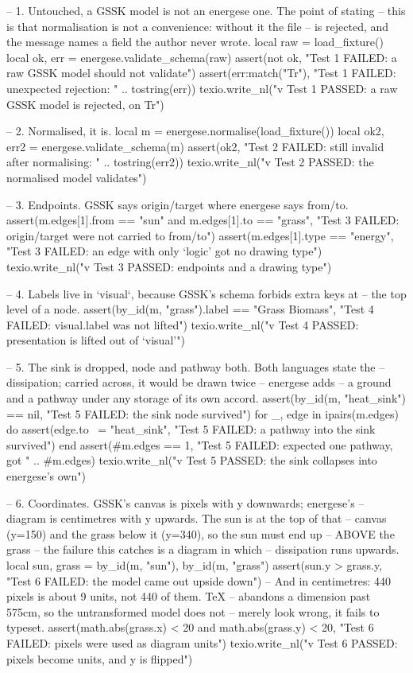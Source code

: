 \documentclass{article}
\begin{document}
\begin{luacode*}
    -- 1. Untouched, a GSSK model is not an energese one. The point of stating
    --    this is that normalisation is not a convenience: without it the file
    --    is rejected, and the message names a field the author never wrote.
    local raw = load_fixture()
    local ok, err = energese.validate_schema(raw)
    assert(not ok, "Test 1 FAILED: a raw GSSK model should not validate")
    assert(err:match("Tr"), "Test 1 FAILED: unexpected rejection: " .. tostring(err))
    texio.write_nl("v Test 1 PASSED: a raw GSSK model is rejected, on Tr")

    -- 2. Normalised, it is.
    local m = energese.normalise(load_fixture())
    local ok2, err2 = energese.validate_schema(m)
    assert(ok2, "Test 2 FAILED: still invalid after normalising: " .. tostring(err2))
    texio.write_nl("v Test 2 PASSED: the normalised model validates")

    -- 3. Endpoints. GSSK says origin/target where energese says from/to.
    assert(m.edges[1].from == "sun" and m.edges[1].to == "grass",
           "Test 3 FAILED: origin/target were not carried to from/to")
    assert(m.edges[1].type == "energy",
           "Test 3 FAILED: an edge with only `logic' got no drawing type")
    texio.write_nl("v Test 3 PASSED: endpoints and a drawing type")

    -- 4. Labels live in `visual`, because GSSK's schema forbids extra keys at
    --    the top level of a node.
    assert(by_id(m, "grass").label == "Grass Biomass",
           "Test 4 FAILED: visual.label was not lifted")
    texio.write_nl("v Test 4 PASSED: presentation is lifted out of `visual'")

    -- 5. The sink is dropped, node and pathway both. Both languages state the
    --    dissipation; carried across, it would be drawn twice -- energese adds
    --    a ground and a pathway under any storage of its own accord.
    assert(by_id(m, "heat_sink") == nil, "Test 5 FAILED: the sink node survived")
    for _, edge in ipairs(m.edges) do
        assert(edge.to ~= "heat_sink", "Test 5 FAILED: a pathway into the sink survived")
    end
    assert(#m.edges == 1, "Test 5 FAILED: expected one pathway, got " .. #m.edges)
    texio.write_nl("v Test 5 PASSED: the sink collapses into energese's own")

    -- 6. Coordinates. GSSK's canvas is pixels with y downwards; energese's
    --    diagram is centimetres with y upwards. The sun is at the top of that
    --    canvas (y=150) and the grass below it (y=340), so the sun must end up
    --    ABOVE the grass -- the failure this catches is a diagram in which
    --    dissipation runs upwards.
    local sun, grass = by_id(m, "sun"), by_id(m, "grass")
    assert(sun.y > grass.y, "Test 6 FAILED: the model came out upside down")
    -- And in centimetres: 440 pixels is about 9 units, not 440 of them. TeX
    -- abandons a dimension past 575cm, so the untransformed model does not
    -- merely look wrong, it fails to typeset.
    assert(math.abs(grass.x) < 20 and math.abs(grass.y) < 20,
           "Test 6 FAILED: pixels were used as diagram units")
    texio.write_nl("v Test 6 PASSED: pixels become units, and y is flipped")


\end{luacode*}
\end{document}
